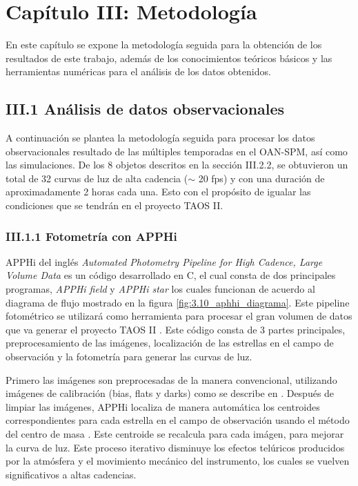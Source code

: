 \chapter*{\textbf{Capítulo III: Metodología}}
\label{ch:Metodologia}
\setcounter{chapter}{3}
\setcounter{equation}{0}
\setcounter{figure}{0}
\setcounter{table}{0}

En este capítulo se expone la metodología seguida para la obtención de los resultados de este trabajo, adem\'as de los conocimientos teóricos básicos y las herramientas numéricas para el análisis de los datos obtenidos.

\section*{III.1 Análisis de datos observacionales}

A continuación se plantea la metodología seguida para procesar los datos observacionales resultado de las múltiples temporadas en el OAN-SPM, así como las simulaciones. De los 8 objetos descritos en la sección III.2.2, se obtuvieron un total de 32 curvas de luz de alta cadencia ($\sim$ 20 fps) y con una duración de aproximadamente 2 horas cada una. Esto con el propósito de igualar las condiciones que se tendrán en el proyecto TAOS II.

\subsection*{III.1.1 Fotometría con APPHi}

APPHi del inglés \textit{Automated Photometry Pipeline for High Cadence, Large Volume Data} es un código desarrollado en C, el cual consta de dos principales programas, \textit{APPHi field} y \textit{APPHi star} los cuales funcionan de acuerdo al diagrama de flujo mostrado en la figura \ref{fig:3.10_aphhi_diagrama}.  Este pipeline fotométrico se utilizará como herramienta para procesar el gran volumen de datos que va generar el proyecto TAOS II \cite{lehner2016status}. Este código consta de 3 partes principales, preprocesamiento de las imágenes, localización de las estrellas en el campo de observación y la fotometría para generar las curvas de luz.

Primero las imágenes son preprocesadas de la manera convencional, utilizando imágenes de calibración (bias, flats y darks) como se describe en \cite{romanishin2006introduction}. Después de limpiar las imágenes, APPHi localiza de manera automática los centroides correspondientes para cada estrella en el campo de observación usando el método del centro de masa \cite{chong2004introduction}. Este centroide se recalcula para cada imágen, para mejorar la curva de luz. Este proceso iterativo disminuye los efectos telúricos producidos por la atmósfera y el movimiento mecánico del instrumento, los cuales se vuelven significativos a altas cadencias. 

